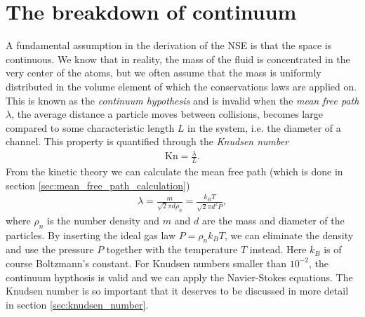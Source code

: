 \section{The breakdown of continuum}
\label{sec:continuum_breakdown}
A fundamental assumption in the derivation of the NSE is that the space is continuous. We know that in reality, the mass of the fluid is concentrated in the very center of the atoms, but we often assume that the mass is uniformly distributed in the volume element of which the conservations laws are applied on. This is known as the \textit{continuum hypothesis} and is invalid when the \textit{mean free path} $\lambda$, the average distance a particle moves between collisions, becomes large compared to some characteristic length $L$ in the system, i.e. the diameter of a channel\cite{karniadakis2005microflows}. This property is quantified through the \textit{Knudsen number}
\begin{align}
	\text{Kn} = \frac{\lambda}{L}.
\end{align}
From the kinetic theory we can calculate the mean free path (which is done in section \ref{sec:mean_free_path_calculation})
\begin{align}
	\lambda = \frac{m}{\sqrt 2 \pi d \rho_n} = \frac{k_B T}{\sqrt 2 \pi d^2 P},
\end{align}
where $\rho_n$ is the number density and $m$ and $d$ are the mass and diameter of the particles. By inserting the ideal gas law $P = \rho_n k_BT$, we can eliminate the density and use the pressure $P$ together with the temperature $T$ instead. Here $k_B$ is of course Boltzmann's constant. For Knudsen numbers smaller than $10^{-2}$, the continuum hypthosis is valid and we can apply the Navier-Stokes equations\cite{karniadakis2005microflows}. The Knudsen number is so important that it deserves to be discussed in more detail in section \ref{sec:knudsen_number}.
